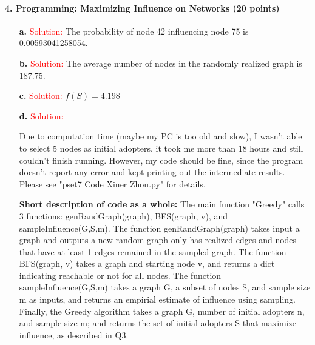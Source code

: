 \documentclass[11pt]{article} %
\begin{document}
\paragraph{4. Programming: Maximizing Influence on Networks (20 points)}

\begin{itemize}
\item[\textbf{a.}]  
\textcolor{red}{Solution:}
The probability of node 42 influencing node 75 is 0.00593041258054.

\item[\textbf{b. }]  
\textcolor{red}{Solution:}
The average number of nodes in the randomly realized graph is 187.75.

\item[\textbf{c. }] 
\textcolor{red}{Solution:}
$f(S)= 4.198$

\item[\textbf{d. }]  
\textcolor{red}{Solution:}

Due to computation time (maybe my PC is too old and slow), I wasn't able to select 5 nodes as initial adopters, it took me more than 18 hours and still couldn't finish running. However, my code should be fine, since the program doesn't report any error and kept printing out the intermediate results. Please see "pset7 Code Xiner Zhou.py" for details.

\textbf{Short description of code as a whole:} The main function "Greedy" calls 3 functions: genRandGraph(graph), BFS(graph, v), and sampleInfluence(G,S,m).  The function genRandGraph(graph) takes input a graph and outputs a new random graph only has realized edges and nodes that have at least 1 edges remained in the sampled graph. The function BFS(graph, v) takes a graph and starting node v, and returns a dict indicating reachable or not for all nodes. The function sampleInfluence(G,S,m) takes a graph G, a subset of nodes S, and sample size m as inputs, and returns an empirial estimate of influence using sampling. Finally, the Greedy algorithm takes a graph G, number of initial adopters n, and sample size m;  and returns the set of initial adopters S that maximize influence, as described in Q3. 

\end{itemize}
	 
 
 
\end{document}
